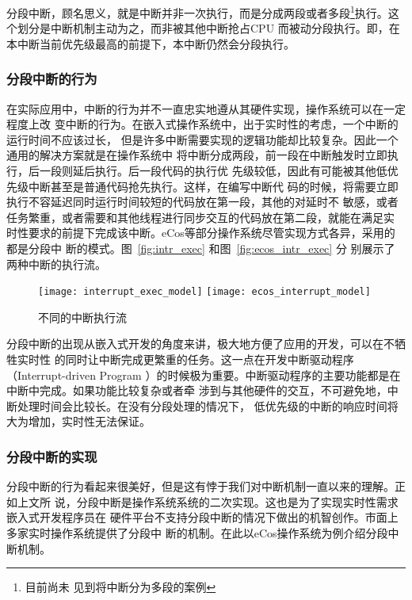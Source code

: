 分段中断，顾名思义，就是中断并非一次执行，而是分成两段或者多段\footnote{目前尚未
见到将中断分为多段的案例}执行。这个划分是中断机制主动为之，而非被其他中断抢占CPU
而被动分段执行。即，在本中断当前优先级最高的前提下，本中断仍然会分段执行。

\subsubsection{分段中断的行为}
\label{subsubsec:segment_behavior}

在实际应用中，中断的行为并不一直忠实地遵从其硬件实现，操作系统可以在一定程度上改
变中断的行为。在嵌入式操作系统中，出于实时性的考虑，一个中断的运行时间不应该过长，
但是许多中断需要实现的逻辑功能却比较复杂。因此一个通用的解决方案就是在操作系统中
将中断分成两段，前一段在中断触发时立即执行，后一段则延后执行。后一段代码的执行优
先级较低，因此有可能被其他低优先级中断甚至是普通代码抢先执行。这样，在编写中断代
码的时候，将需要立即执行不容延迟同时运行时间较短的代码放在第一段，其他的对延时不
敏感，或者任务繁重，或者需要和其他线程进行同步交互的代码放在第二段，就能在满足实
时性要求的前提下完成该中断。eCos等部分操作系统尽管实现方式各异，采用的都是分段中
断的模式。\cite{ecos}图~\ref{fig:intr_exec} 和图~\ref{fig:ecos_intr_exec} 分
别展示了两种中断的执行流。

\begin{figure}[H]
	\centering
	{\texttt{[image: interrupt\_exec\_model]}}
	\hspace{4em}%
	{\texttt{[image: ecos\_interrupt\_model]}}
	\caption{不同的中断执行流}
	\label{fig:two_intr_exec}
\end{figure}

分段中断的出现从嵌入式开发的角度来讲，极大地方便了应用的开发，可以在不牺牲实时性
的同时让中断完成更繁重的任务。这一点在开发中断驱动程序（Interrupt-driven Program
）的时候极为重要。中断驱动程序的主要功能都是在中断中完成。如果功能比较复杂或者牵
涉到与其他硬件的交互，不可避免地，中断处理时间会比较长。在没有分段处理的情况下，
低优先级的中断的响应时间将大为增加，实时性无法保证。

\subsubsection{分段中断的实现}
\label{subsubsec:segment_software}

分段中断的行为看起来很美好，但是这有悖于我们对中断机制一直以来的理解。正如上文所
说，分段中断是操作系统系统的二次实现。这也是为了实现实时性需求嵌入式开发程序员在
硬件平台不支持分段中断的情况下做出的机智创作。市面上多家实时操作系统提供了分段中
断的机制。在此以eCos操作系统为例介绍分段中断机制。


